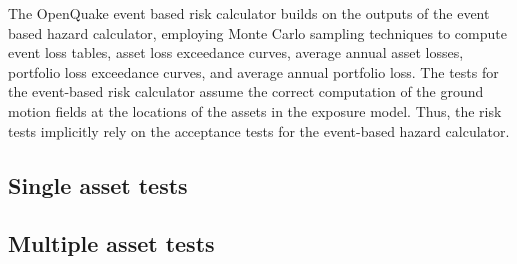 The OpenQuake event based risk calculator builds on the outputs of the event based hazard calculator, employing Monte Carlo sampling techniques to compute event loss tables, asset loss exceedance curves, average annual asset losses, portfolio loss exceedance curves, and average annual portfolio loss. The tests for the event-based risk calculator assume the correct computation of the ground motion fields at the locations of the assets in the exposure model. Thus, the risk tests implicitly rely on the acceptance tests for the event-based hazard calculator.

\subsection{Single asset tests}
\label{subsec:acc-ebr-single}


\subsection{Multiple asset tests}
\label{subsec:acc-ebr-multiple}


% 

% 
